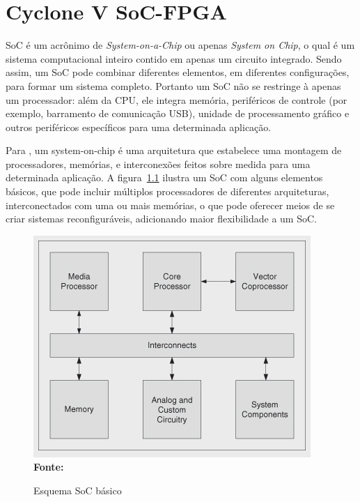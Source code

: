 \chapter{Cyclone V SoC-FPGA}\label{cap:soc}

SoC é um acrônimo de \textit{System-on-a-Chip} ou apenas \textit{System on Chip}, o qual é um sistema computacional inteiro contido em apenas um circuito integrado. Sendo assim, um SoC pode combinar diferentes elementos, em diferentes configurações, para formar um sistema completo.  Portanto um SoC não se restringe à apenas um processador: além da CPU,  ele integra memória, periféricos de controle (por exemplo, barramento de comunicação USB), unidade de processamento gráfico e outros periféricos específicos para uma determinada aplicação.  

Para , um system-on-chip é uma arquitetura que estabelece uma montagem de processadores, memórias, e interconexões feitos sobre medida para uma determinada aplicação. A figura~\ref{fig:socbasic} ilustra um SoC com alguns elementos básicos, que pode incluir múltiplos processadores  de diferentes arquiteturas, interconectados com uma ou mais memórias, o que pode oferecer meios de se criar sistemas reconfiguráveis, adicionando maior flexibilidade a um SoC.  

\begin{figure}[ht]
	\caption{Esquema SoC básico}
	\begin{center}
		\includegraphics[scale=0.68]{imagens/basicsoc.png}\\
		{\small \textbf{Fonte:} }
    \end{center}\label{fig:socbasic}
\end{figure}


